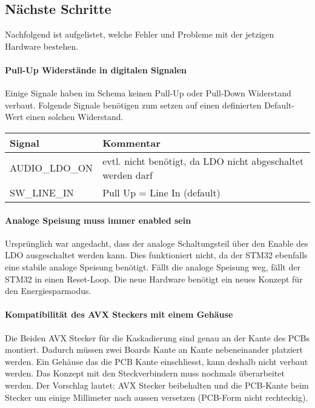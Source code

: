\clearpage

\subsection{Nächste Schritte}

Nachfolgend ist aufgelistet, welche Fehler und Probleme mit der jetzigen Hardware bestehen.

\paragraph{Pull-Up Widerstände in digitalen Signalen}

Einige Signale haben im Schema keinen Pull-Up oder Pull-Down Widerstand verbaut.
Folgende Signale benötigen zum setzen auf einen definierten Default-Wert einen solchen Widerstand.
\begin{table}[H]
	\centering
	\begin{tabular}{|l|l|}
		\hline
		\textbf{Signal} & \textbf{Kommentar}                                          \\ \hline
		AUDIO\_LDO\_ON  & evtl. nicht benötigt, da LDO nicht abgeschaltet werden darf \\ \hline
		SW\_LINE\_IN    & Pull Up = Line In (default)                                 \\ \hline
	\end{tabular}
\end{table}

\paragraph{Analoge Speisung muss immer enabled sein}

Ursprünglich war angedacht, dass der analoge Schaltungsteil über den Enable des LDO ausgeschaltet werden kann. Dies funktioniert nicht, da der STM32 ebenfalls eine stabile analoge Speisung benötigt. Fällt die analoge Speisung weg, fällt der STM32 in einen Reset-Loop.
Die neue Hardware benötigt ein neues Konzept für den Energiesparmodus.

\paragraph{Kompatibilität des AVX Steckers mit einem Gehäuse}

Die Beiden AVX Stecker für die Kaskadierung sind genau an der Kante des PCBs montiert. Dadurch müssen zwei Boards Kante an Kante nebeneinander platziert werden.
Ein Gehäuse das die PCB Kante einschliesst, kann deshalb nicht verbaut werden.
Das Konzept mit den Steckverbindern muss nochmals überarbeitet werden.
Der Vorschlag lautet: AVX Stecker beibehalten und die PCB-Kante beim Stecker um einige Millimeter nach aussen versetzen (PCB-Form nicht rechteckig).

